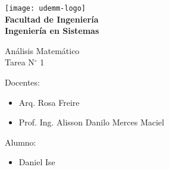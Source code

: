 \begin{titlepage}
	\begin{center}
		\vspace*{0.5cm}
		\texttt{[image: udemm-logo]}\\
		\vspace{0.2cm}
		\Large
		\textbf{Facultad de Ingeniería}\\
		\textbf{Ingeniería en Sistemas}\\
		\vspace{2cm}

		\Huge
		Análisis Matemático\\
		Tarea N$^{\circ}$ 1
		\vfill

		\raggedright
		\Large
		Docentes:
		\begin{itemize}
			\item[] Arq. Rosa Freire\\
			\item[] Prof. Ing. Alisson Danilo Merces Maciel\\
		\end{itemize}
		Alumno: 
		\begin{itemize}
			\item[] Daniel Ise
		\end{itemize}
		\vspace{1cm}

	\end{center}
\end{titlepage}
